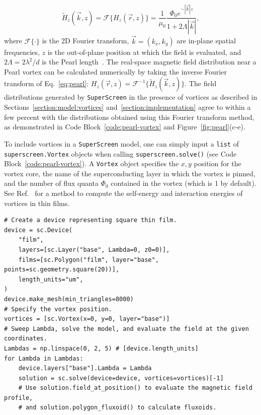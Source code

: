 \documentclass[final,3p,times]{elsarticle}
\newcommand{\inline}[1]{\texttt{#1}\xspace}
\newcommand{\SuperScreen}{\inline{SuperScreen}}
\newenvironment{code}{\captionsetup{type=listing}}{\hfill}
\begin{document}
\begin{equation}
    \tilde{H}_z(\vec{k}, z)=\mathcal{F}\{H_z(\vec{r}, z)\}=\frac{1}{\mu_0}\frac{\Phi_0e^{-|\vec{k}|z}}{1+2\Lambda|\vec{k}|},
    \label{eq:pearl}
\end{equation}
where $\mathcal{F}\{\cdot\}$ is the 2D Fourier transform, $\vec{k}=(k_x, k_y)$ are in-plane spatial frequencies, $z$ is the out-of-plane position at which the field is evaluated, and $2\Lambda = 2\lambda^2 / d$ is the Pearl length~\cite{Pearl1964-cl, Tafuri2004-ap}. The real-space magnetic field distribution near a Pearl vortex can be calculated numerically by taking the inverse Fourier transform of Eq.~\ref{eq:pearl}: $H_z(\vec{r}, z)=\mathcal{F}^{-1}\{\tilde{H}_z(\vec{k}, z)\}$. The field distributions generated by \SuperScreen in the presence of vortices as described in Sections~\ref{section:model:vortices} and~\ref{section:implementation} agree to within a few percent with the distributions obtained using this Fourier transform method, as demonstrated in Code Block~\ref{code:pearl-vortex} and Figure~\ref{fig:pearl}(c-e).

To include vortices in a \SuperScreen model, one can simply input a \inline{list} of \inline{superscreen.Vortex} objects when calling \inline{superscreen.solve()} (see Code Block~\ref{code:pearl-vortex}). A \inline{Vortex} object specifies the $x,y$ position for the vortex core, the name of the superconducting layer in which the vortex is pinned, and the number of flux quanta $\Phi_0$ contained in the vortex (which is 1 by default). See Ref.~\cite{Brandt2005-wj} for a method to compute the self-energy and interaction energies of vortices in thin films.

\begin{code}
\begin{verbatim}
# Create a device representing square thin film.
device = sc.Device(
    "film",
    layers=[sc.Layer("base", Lambda=0, z0=0)],
    films=[sc.Polygon("film", layer="base", points=sc.geometry.square(20))],
    length_units="um",
)
device.make_mesh(min_triangles=8000)
# Specify the vortex position.
vortices = [sc.Vortex(x=0, y=0, layer="base")]
# Sweep Lambda, solve the model, and evaluate the field at the given coordinates.
Lambdas = np.linspace(0, 2, 5) # [device.length_units]
for Lambda in Lambdas:
    device.layers["base"].Lambda = Lambda
    solution = sc.solve(device=device, vortices=vortices)[-1]
    # Use solution.field_at_position() to evaluate the magnetic field profile,
    # and solution.polygon_fluxoid() to calculate fluxoids.
\end{verbatim}
\label{code:pearl-vortex}
\end{code}
\end{document}
